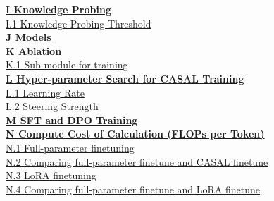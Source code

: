 \documentclass{article} %
\begin{document}
\vspace{0.5em}
\noindent \textbf{\hyperref[app:probing]{I \quad Knowledge Probing}} \dotfill \textbf{\pageref{app:probing}} \\
\phantom{I}\quad \hyperref[app:threshold]{I.1 \quad Knowledge Probing Threshold} \dotfill \pageref{app:threshold} \\

\vspace{0.5em}
\noindent \textbf{\hyperref[app:model]{J \quad Models}} \dotfill \textbf{\pageref{app:model}} \\

\vspace{0.5em}
\noindent \textbf{\hyperref[app:ablation]{K \quad Ablation}} \dotfill \textbf{\pageref{app:ablation}} \\
\phantom{K}\quad \hyperref[app:submodule]{K.1 \quad Sub-module for training} \dotfill \pageref{app:submodule} \\

\vspace{0.5em}
\noindent \textbf{\hyperref[app:hyper]{L \quad Hyper-parameter Search for CASAL Training}} \dotfill \textbf{\pageref{app:hyper}} \\
\phantom{L}\quad \hyperref[app:learning_rate]{L.1 \quad Learning Rate} \dotfill \pageref{app:learning_rate} \\
\phantom{L}\quad \hyperref[app:steering_strength]{L.2 \quad Steering Strength} \dotfill \pageref{app:steering_strength} \\

\vspace{0.5em}
\noindent \textbf{\hyperref[app:baseline]{M \quad SFT and DPO Training}} \dotfill \textbf{\pageref{app:baseline}} \\

\vspace{0.5em}
\noindent \textbf{\hyperref[app:flops]{N \quad Compute Cost of Calculation (FLOPs per Token)}} \dotfill \textbf{\pageref{app:flops}} \\
\phantom{N}\quad \hyperref[app:full_param]{N.1 \quad Full-parameter finetuning} \dotfill \pageref{app:full_param} \\
\phantom{N}\quad \hyperref[app:casal_comparison]{N.2 \quad Comparing full-parameter finetune and CASAL finetune} \dotfill \pageref{app:casal_comparison} \\
\phantom{N}\quad \hyperref[app:lora]{N.3 \quad LoRA finetuning} \dotfill \pageref{app:lora} \\
\phantom{N}\quad \hyperref[app:lora_comparison]{N.4 \quad Comparing full-parameter finetune and LoRA finetune} \dotfill \pageref{app:lora_comparison} \\
\end{document}
